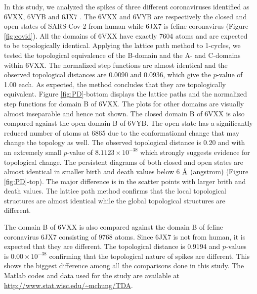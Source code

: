 \documentclass{llncs}
\begin{document}
In this study, we analyzed the spikes of three different coronaviruses identified as 6VXX, 6VYB \cite{walls.2020} and 6JX7 \cite{yang.2020}. The 6VXX and 6VYB are respectively the closed and open states of SARS-Cov-2 from human while 6JX7 is feline coronavirus (Figure \ref{fig:covid}).  All the domains of 6VXX have exactly 7604 atoms and are expected to be topologically identical. Applying the lattice path method to 1-cycles, we tested the topological equivalence of the B-domain and the A- and C-domains within 6VXX. The normalized step functions are  almost identical and the observed topological distances are 0.0090 and 0.0936, which give the $p$-value of  1.00 each. As expected, the method concludes that they are topologically equivalent. Figure \ref{fig:PD}-bottom displays  the lattice paths and the normalized step functions for domain B of 6VXX. The plots for other domains are visually almost inseparable and hence not shown. 
The closed domain B of 6VXX  is also compared against the open domain B  of 6VYB.  The open  state has a significantly reduced number of atoms at 6865 due to the conformational change that may change the topology as well. The observed topological distance is 0.20 and with an extremely small  $p$-value of $8.1123 \times 10^{-38}$ which strongly suggests evidence for topological change. The persistent diagrams of both closed and open states are almost identical in smaller birth and death values below 6 $\text{\normalfont\AA}$ (angstrom)  (Figure \ref{fig:PD}-top). The major difference is in the scatter points with larger brith and death values. The  lattice path method confirms that the local topological structures are almost identical while the global topological structures are different. 


The domain B of 6VXX is also compared against the domain B of  feline coronavirus 6JX7 consisting of 9768 atoms. Since 6JX7 is not from human, it is expected that they are different. The topological distance is 0.9194 and $p$-values is $0.00 \times 10^{-38}$ confirming that the topological nature of spikes are different. This shows the biggest  difference among all the comparisons done in this study. 
 The Matlab codes and data used for the study are available at \url{http://www.stat.wisc.edu/~mchung/TDA}.
 
\end{document}
